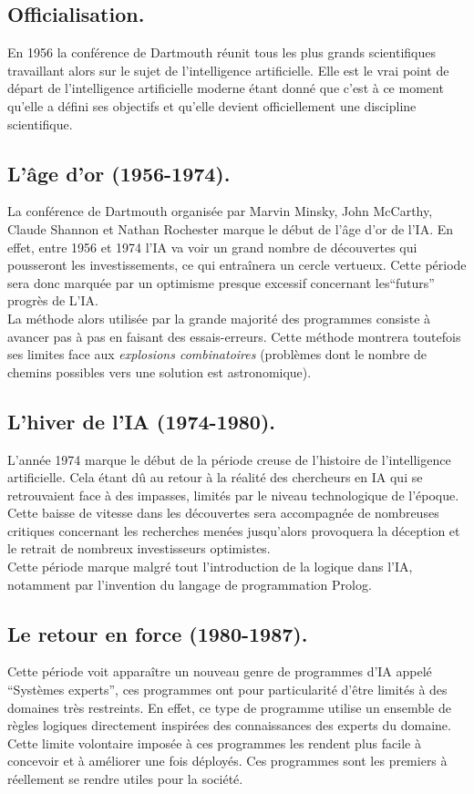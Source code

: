 \documentclass[a4paper, 12pt]{article}
\numberwithin{equation}{subsection}
\begin{document}
\subsection{Officialisation.}
En 1956 la conférence de Dartmouth réunit tous les plus grands scientifiques travaillant alors sur le sujet de l'intelligence artificielle. Elle est le vrai point de départ de l'intelligence artificielle moderne étant donné que c'est à ce moment qu'elle a défini ses objectifs et qu'elle devient officiellement une discipline scientifique.
\subsection{L'âge d'or (1956-1974).}
La conférence de Dartmouth organisée par Marvin Minsky, John McCarthy, Claude Shannon et Nathan Rochester marque le début de l'âge d'or de l'IA. En effet, entre 1956 et 1974 l'IA va voir un grand nombre de découvertes qui pousseront les investissements, ce qui entraînera un cercle vertueux. Cette période sera donc marquée par un optimisme presque excessif concernant les``futurs'' progrès de L'IA.\\

La méthode alors utilisée par la grande majorité des programmes consiste à avancer pas à pas en faisant des essais-erreurs. Cette méthode montrera toutefois ses limites face aux \textit{explosions combinatoires} (problèmes dont le nombre de chemins possibles vers une solution est astronomique).
\subsection{L'hiver de l'IA (1974-1980).}
L'année 1974 marque le début de la période creuse de l'histoire de l'intelligence artificielle. Cela étant dû au retour à la réalité des chercheurs en IA qui se retrouvaient face à des impasses, limités par le niveau technologique de l'époque. Cette baisse de vitesse dans les découvertes sera accompagnée de nombreuses critiques concernant les recherches menées jusqu'alors provoquera la déception et le retrait de nombreux investisseurs optimistes.\\

Cette période marque malgré tout l'introduction de la logique dans l'IA, notamment par l'invention du langage de programmation Prolog.
\subsection{Le retour en force (1980-1987).}
Cette période voit apparaître un nouveau genre de programmes d'IA appelé ``Systèmes experts'', ces programmes ont pour particularité d'être limités à des domaines très restreints. En effet, ce type de programme utilise un ensemble de règles logiques directement inspirées des connaissances des experts du domaine. Cette limite volontaire imposée à ces programmes les rendent plus facile à concevoir et à améliorer une fois déployés. Ces programmes sont les premiers à réellement se rendre utiles pour la société.\\
\end{document}
